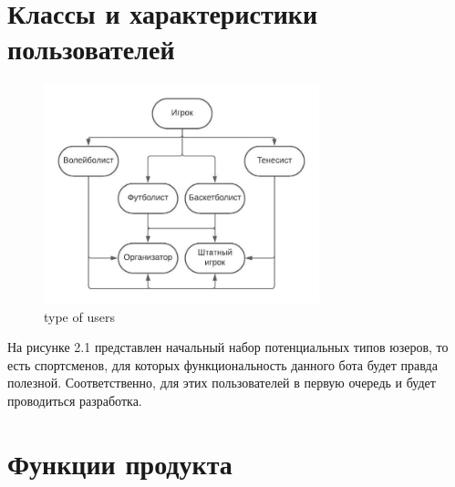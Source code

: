 \documentclass{scrreprt}
\begin{document}
\section{Классы и характеристики пользователей}
\begin{figure}
    \centering
    \includegraphics[width=8cm]{project scope (1).jpeg}
    \caption{type of users}
    \label{fig:type of users}
\end{figure}
\newline
На рисунке 2.1 представлен начальный набор потенциальных типов юзеров, то есть спортсменов, для которых функциональность данного бота будет правда полезной. Соответственно, для этих пользователей в первую очередь и будет проводиться разработка. 

\pagebreak

\section{Функции продукта}
\end{document}
